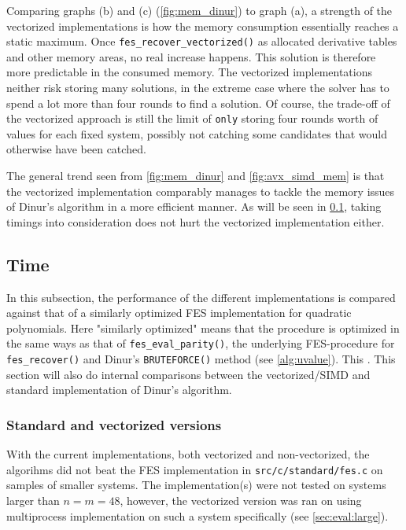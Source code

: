 Comparing graphs (b) and (c) (\cref{fig:mem_dinur}) to graph (a), a strength of the vectorized implementations is how the memory consumption essentially reaches a static maximum. Once \texttt{fes\_recover\_vectorized()} as allocated derivative tables and other memory areas, no real increase happens. This solution is therefore more predictable in the consumed memory. The vectorized implementations neither risk storing many solutions, in the extreme case where the solver has to spend a lot more than four rounds to find a solution. Of course, the trade-off of the vectorized approach is still the limit of \texttt{only} storing four rounds worth of values for each fixed system, possibly not catching some candidates that would otherwise have been catched.

The general trend seen from \cref{fig:mem_dinur} and \cref{fig:avx_simd_mem} is that the vectorized implementation comparably manages to tackle the memory issues of Dinur's algorithm in a more efficient manner. As will be seen in \cref{sec:eval:dinur_fes}, taking timings into consideration does not hurt the vectorized implementation either.

\subsection{Time} \label{sec:eval:dinur_fes}
In this subsection, the performance of the different implementations is compared against that of a similarly optimized FES implementation for quadratic polynomials. Here "similarly optimized" means that the procedure is optimized in the same ways as that of \texttt{fes\_eval\_parity()}, the underlying FES-procedure for \texttt{fes\_recover()} and Dinur's \texttt{BRUTEFORCE()} method (see \cref{alg:uvalue}). This . This section will also do internal comparisons between the vectorized/SIMD and standard implementation of Dinur's algorithm. 

\subsubsection{Standard and vectorized versions}
With the current implementations, both vectorized and non-vectorized, the algorihms did not beat the FES implementation in \texttt{src/c/standard/fes.c} on samples of smaller systems. The implementation(s) were not tested on systems larger than $n = m = 48$, however, the vectorized version was ran on using multiprocess implementation on such a system specifically (see \cref{sec:eval:large}).

